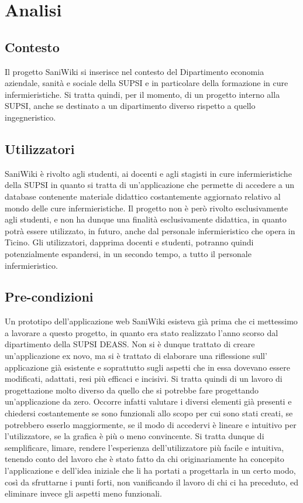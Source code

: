 \documentclass[twoside]{supsistudent}
\begin{document}
\chapter{Analisi}

\section{Contesto}
Il progetto SaniWiki si inserisce nel contesto del Dipartimento economia aziendale, sanità e sociale della SUPSI e in particolare della formazione in cure infermieristiche. Si tratta quindi, per il momento, di un progetto interno alla SUPSI, anche se destinato a un dipartimento diverso rispetto a quello ingegneristico.

\section{Utilizzatori}
SaniWiki è rivolto agli studenti, ai docenti e agli stagisti in cure infermieristiche della SUPSI in quanto si tratta di un’applicazione che permette di accedere a un database contenente materiale didattico costantemente aggiornato relativo al mondo delle cure infermieristiche. Il progetto non è però rivolto esclusivamente agli studenti, e non ha dunque una finalità esclusivamente didattica, in quanto potrà essere utilizzato, in futuro, anche dal personale infermieristico che opera in Ticino. Gli utilizzatori, dapprima docenti e studenti, potranno quindi potenzialmente espandersi, in un secondo tempo, a tutto il personale infermieristico.

\section{Pre-condizioni}
Un prototipo dell’applicazione web SaniWiki esisteva già prima che ci mettessimo a lavorare a questo progetto, in quanto era stato realizzato l’anno scorso dal dipartimento della SUPSI DEASS. Non si è dunque trattato di creare un’applicazione ex novo, ma si è trattato di elaborare una riflessione sull’ applicazione già esistente e soprattutto sugli aspetti che in essa dovevano essere modificati, adattati, resi più efficaci e incisivi. Si tratta quindi di un lavoro di progettazione molto diverso da quello che si potrebbe fare progettando un’applicazione da zero. Occorre infatti valutare i diversi elementi già presenti e chiedersi costantemente se sono funzionali allo scopo per cui sono stati creati, se potrebbero esserlo maggiormente, se il modo di accedervi è lineare e intuitivo per l’utilizzatore, se la grafica è più o meno convincente. Si tratta dunque di semplificare, limare, rendere l’esperienza dell’utilizzatore più facile e intuitiva, tenendo conto del lavoro che è stato fatto da chi originariamente ha concepito l’applicazione e dell’idea iniziale che li ha portati a progettarla in un certo modo, così da sfruttarne i punti forti, non vanificando il lavoro di chi ci ha preceduto, ed eliminare invece gli aspetti meno funzionali.
\end{document}
